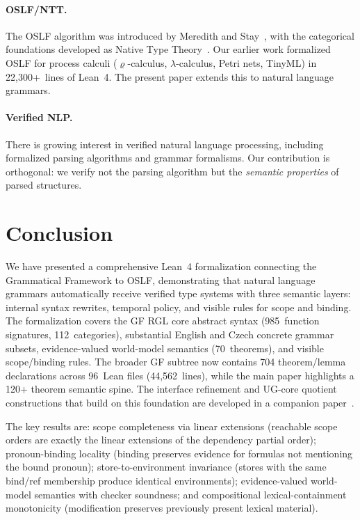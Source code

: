 \documentclass[11pt]{article}
\newcommand{\OSLF}{\textup{OSLF}}
\newcommand{\GF}{\textup{GF}}
\newcommand{\RGL}{\textup{RGL}}
\begin{document}
\paragraph{OSLF/NTT.}  The \OSLF{} algorithm was introduced
by Meredith and Stay~\cite{MeredithStayOSLF2020}, with the categorical
foundations developed as Native Type Theory~\cite{WilliamsStay2021}.
Our earlier work formalized \OSLF{} for process calculi
($\varrho$-calculus, $\lambda$-calculus, Petri nets, TinyML) in
22,300+~lines of Lean~4.  The present paper extends this to natural
language grammars.

\paragraph{Verified NLP.}  There is growing interest in verified natural
language processing, including formalized parsing algorithms and grammar
formalisms.  Our contribution is orthogonal: we verify not the parsing
algorithm but the \emph{semantic properties} of parsed structures.

\section{Conclusion}
\label{sec:conclusion}

We have presented a comprehensive Lean~4 formalization connecting the
Grammatical Framework to \OSLF{}, demonstrating that natural language
grammars automatically receive verified type systems with three semantic
layers: internal syntax rewrites, temporal policy, and visible rules for
scope and binding.  The formalization covers the \GF{} \RGL{}
core abstract syntax (985~function signatures, 112~categories), substantial English and Czech
concrete grammar subsets, evidence-valued world-model semantics (70~theorems),
and visible scope/binding rules.
The broader \GF{} subtree now contains 704 theorem/lemma declarations across
96~Lean files (44,562~lines), while the main paper highlights a 120+ theorem
semantic spine.  The interface refinement and UG-core quotient constructions
that build on this foundation are developed in a companion paper~\cite{UGCores2026}.

The key results are: scope completeness via linear extensions
(reachable scope orders are exactly the linear extensions of the
dependency partial order); pronoun-binding locality (binding preserves
evidence for formulas not mentioning the bound pronoun);
store-to-environment invariance (stores with the same bind/ref
membership produce identical environments); evidence-valued
world-model semantics with checker soundness; and compositional
lexical-containment monotonicity (modification preserves previously
present lexical material).
\end{document}
